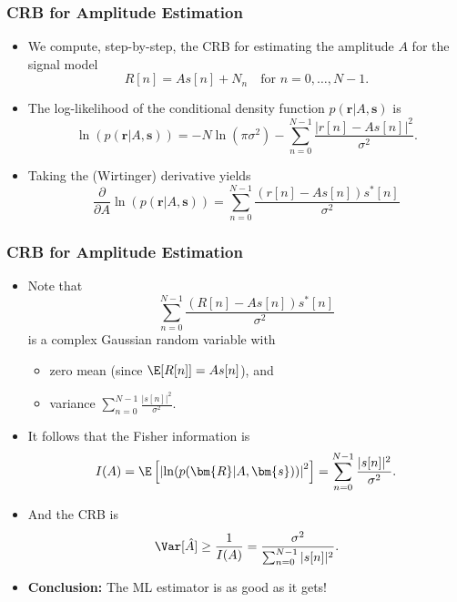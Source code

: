 \begin{frame}
  \frametitle{CRB for Amplitude Estimation}
  \begin{itemize}
  \item We compute, step-by-step, the CRB for estimating the amplitude $A$ for the signal
    model
    \[
      R[n] = A s[n] + N_n \quad \text{for $n=0, \ldots, N-1$.}
    \]
  \item The log-likelihood of the conditional density function
    $p(\bm{r} |A, \bm{s})$ is
    \[
      \ln(p(\bm{r} |A, \bm{s})) = -N \ln(\pi \sigma^2) -
      \sum_{n=0}^{N-1} \frac{|r[n] - As[n]|^2}{\sigma^2}.
    \]
  \item Taking the (Wirtinger) derivative yields
    \[
      \frac{\partial}{\partial A} \ln(p(\bm{r} | A, \bm{s})) =
      \sum_{n=0}^{N-1} \frac{(r[n] - As[n])s^*[n]}{\sigma^2}
    \]
  \end{itemize}
\end{frame}

\begin{frame}
  \frametitle{CRB for Amplitude Estimation}
  \begin{itemize}
  \item Note that
    \[
      \sum_{n=0}^{N-1} \frac{(R[n] - As[n])s^*[n]}{\sigma^2}
    \]
    is a complex Gaussian random variable with
    \begin{itemize}
    \item zero mean (since $\E[R[n]] = As[n]$), and
    \item variance $\sum_{n=0}^{N-1} \frac{|s[n]|^2}{\sigma^2}$.
    \end{itemize}
  \item It follows that the Fisher information is
    \[
      I(A) = \E\left[{\left|
            \ln(p(\bm{R} |A, \bm{s}))\right|}^2
        \right] = \sum_{n=0}^{N-1} \frac{|s[n]|^2}{\sigma^2}.
    \]
  \item And the CRB is
    \[
      \Var[\hat{A}] \geq \frac{1}{I(A)} = \frac{\sigma^2}{\sum_{n=0}^{N-1} |s[n]|^2}.
    \]
  \item \textbf{Conclusion:} The ML estimator is as good as it gets!
  \end{itemize}
\end{frame}

